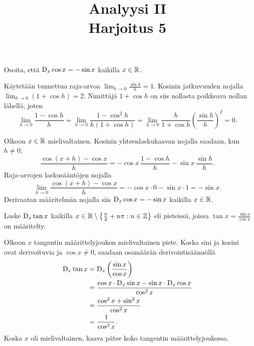 \documentclass[11pt,a4paper]{amsart}
\title{Analyysi II\\Harjoitus 5}
\author{}
\date{}
\theoremstyle{definition}
\begin{document}

\begin{exercise}
  Osoita, että \(\operatorname{D}_{x} \cos x = -\sin x\) kaikilla \(x \in \mathbb{R}\).
\end{exercise}

\begin{solution}
  Käytetään tunnettua raja-arvoa \(\lim_{h \to 0} \frac{\sin h}{h} = 1\).
  Kosinin jatkuvuuden nojalla \(\lim_{h \to 0}(1 + \cos h) = 2\).
  Nimittäjä \(1 + \cos h\) on siis nollasta poikkeava nollan lähellä, joten
  \[
    \lim_{h \to 0} \frac{1 - \cos h}{h}
    = \lim_{h \to 0} \frac{1 - \cos^2 h}{h(1 + \cos h)}
    = \lim_{h \to 0} \frac{h}{1 + \cos h}\left(\frac{\sin h}{h}\right)^2
    = 0.
  \]

  Olkoon \(x \in \mathbb{R}\) mielivaltainen. Kosinin yhteenlaskukaavan nojalla
  saadaan, kun \(h \neq 0\),
  \[
    \frac{\cos(x + h) - \cos x}{h}
    = -\cos x\,\frac{1 - \cos h}{h} - \sin x\,\frac{\sin h}{h}.
  \]
  Raja-arvojen laskusääntöjen nojalla
  \[
    \lim_{h \to 0} \frac{\cos(x + h) - \cos x}{h}
    = -\cos x \cdot 0 - \sin x \cdot 1
    = -\sin x.
  \]
  Derivaatan määritelmän nojalla siis \(\operatorname{D}_{x} \cos x = -\sin x\)
  kaikilla \(x \in \mathbb{R}\).
\end{solution}

\begin{exercise}
  Laske \(\operatorname{D}_{x} \tan x\) kaikilla
  \(x \in \mathbb{R} \setminus \bigl\{\frac{\pi}{2} + n\pi : n \in \mathbb{Z}\bigr\}\)
  eli pisteissä, joissa \(\tan x = \frac{\sin x}{\cos x}\) on määritelty.
\end{exercise}

\begin{solution}
  Olkoon \(x\) tangentin määrittelyjoukon mielivaltainen piste.
  Koska sini ja kosini ovat derivoituvia ja \(\cos x \neq 0\),
  saadaan osamäärän derivointisäännöllä
  \[
    \begin{aligned}
      \operatorname{D}_{x} \tan x &= \operatorname{D}_{x}\left(\frac{\sin x}{\cos x}\right) \\
      &= \frac{\cos x \cdot \operatorname{D}_{x} \sin x - \sin x \cdot
      \operatorname{D}_{x} \cos x}{\cos^2 x} \\
      &= \frac{\cos^2 x + \sin^2 x}{\cos^2 x} \\
      &= \frac{1}{\cos^2 x}.
    \end{aligned}
  \]
  Koska \(x\) oli mielivaltainen, kaava pätee koko tangentin määrittelyjoukossa.
\end{solution}
\end{document}
